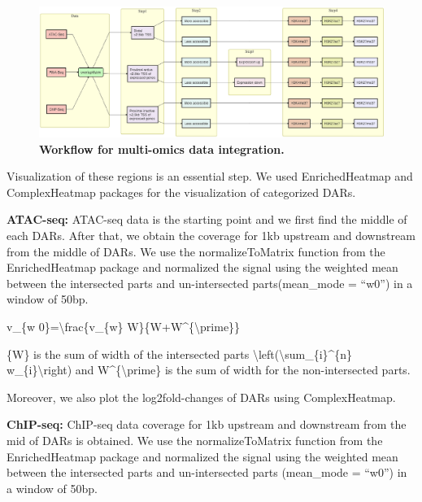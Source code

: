 \documentclass[12pt,twoside]{reedthesis}
\begin{document}
\newpage
\begin{landscape}


\begin{figure}[h]

{\centering \includegraphics{thesis_files/figure-latex/mf8-1} 

}

\caption[Workflow for multi-omics data integration]{\textbf{Workflow for multi-omics data integration.}}\label{fig:mf8}
\end{figure}
\end{landscape}
Visualization of these regions is an essential step. We used
EnrichedHeatmap and ComplexHeatmap packages for the visualization of
categorized DARs.

\textbf{ATAC-seq:} ATAC-seq data is the starting point and we first find the
middle of each DARs. After that, we obtain the coverage for 1kb upstream
and downstream from the middle of DARs. We use the normalizeToMatrix
function from the EnrichedHeatmap package and normalized the signal
using the weighted mean between the intersected parts and un-intersected
parts(mean\_mode = ``w0'') in a window of 50bp.

v\_\{w 0\}=\textbackslash frac\{v\_\{w\} W\}\{W+W\^{}\{\textbackslash prime\}\}

\{W\} is the sum of width of the intersected parts \textbackslash left(\textbackslash sum\_\{i\}\^{}\{n\}
w\_\{i\}\textbackslash right) and W\^{}\{\textbackslash prime\} is the sum of width for the
non-intersected parts.

Moreover, we also plot the log2fold-changes of DARs using
ComplexHeatmap.

\textbf{ChIP-seq:} ChIP-seq data coverage for 1kb upstream and downstream from
the mid of DARs is obtained. We use the normalizeToMatrix function from
the EnrichedHeatmap package and normalized the signal using the weighted
mean between the intersected parts and un-intersected parts (mean\_mode =
``w0'') in a window of 50bp.
\end{document}
